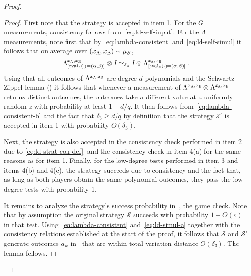 \documentclass[11pt]{article}
\theoremstyle{definition}
\newcommand{\ot}{\otimes}
\newcommand{\eps}{\varepsilon}
\newcommand{\sampler}{\mathcal{S}}
\newcommand{\strategy}{\mathscr{S}}
\newcommand{\labelstyle}[1]{\ensuremath{\textsc{#1}}\xspace}
\newcommand{\alice}{\labelstyle{A}}
\newcommand{\bob}{\labelstyle{B}}
\newcommand{\eval}{\mathrm{eval}}
\begin{document}
\begin{proof}
\begin{proof}
  First note that the strategy is accepted in item 1.
  For the $G$ measurements, consistency follows from~\eqref{eq:ld-self-input}.
  For the $\Lambda$ measurements, note first that
  by~\eqref{eq:lambda-consistent} and~\eqref{eq:ld-self-simul} it follows that
  on average over $(x_\alice,x_\bob)\sim \mu_\sampler$,
  \begin{equation}
    \Lambda^{{x}_\alice, {x}_\bob}_{[\eval_{z}(\cdot) = ( \alpha, \beta)]} \ot I
    \simeq_{\delta_3} I \ot \Lambda^{{x}_\alice, {x}_\bob}_{[\eval_{z}(\cdot)
      = ( \alpha, \beta)]} \;.
    \label{eq:lambda-consistent-b}
  \end{equation}
	Using that all outcomes of $\Lambda^{{x}_\alice, {x}_\bob}$ are degree $d$
  polynomials and the Schwartz-Zippel lemma () it
  follows that whenever a measurement of $\Lambda^{{x}_\alice, {x}_\bob}\ot
  \Lambda^{{x}_\alice, {x}_\bob}$ returns distinct outcomes, the outcomes take a
  different value at a uniformly random $z$ with probability at least $1-d/q$.
  It then follows from~\eqref{eq:lambda-consistent-b} and the fact that
  $\delta_3 \geq d/q$ by definition that the strategy $\strategy'$ is accepted
  in item 1 with probability $O(\delta_3)$.

  Next, the strategy is also accepted in the consistency check performed in item
  2 due to \eqref{eq:ld-strat-con-def}, and the consistency check in item 4(a)
  for the same reasons as for item 1.
  Finally, for the low-degree tests performed in item 3 and items 4(b) and 4(c),
  the strategy succeeds due to consistency and the fact that, as long as both
  players obtain the same polynomial outcomes, they pass the low-degree tests
  with probability 1.

  It remains to analyze the strategy's success probability
  in~, the game check.
  Note that by assumption the original strategy $\strategy$ succeeds with
  probability $1-O(\eps)$ in that test.
  Using~\eqref{eq:lambda-consistent} and~\eqref{eq:ld-simul-a} together with the
  consistency relations established at the start of the proof, it follows that
  $\strategy$ and $\strategy'$ generate outcomes $a_w$ in~
  that are within total variation distance $O(\delta_3)$.
  The lemma fellows.
\end{proof}


\end{proof}
\end{document}
